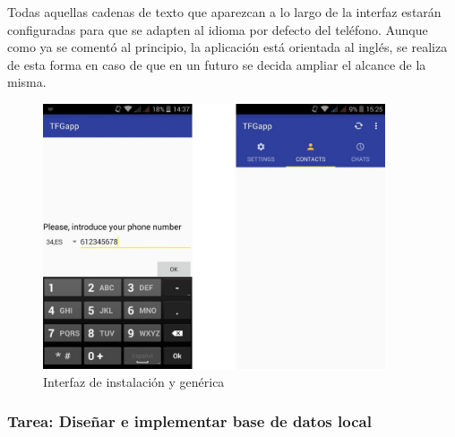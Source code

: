 Todas aquellas cadenas de texto que aparezcan a lo largo de la interfaz estarán configuradas para que se adapten al idioma por defecto del teléfono. Aunque como ya se comentó al principio, la aplicación está orientada al inglés, se realiza de esta forma en caso de que en un futuro se decida ampliar el alcance de la misma.

\begin{figure}[!h]
\begin{center}
\includegraphics[width=0.9\textwidth]{./figures/interfaz-instalacion.jpg}
\caption[Interfaz de instalación y genérica]{Interfaz de instalación y genérica}
\label{fig:interfaz-instalacion}
\end{center}
\end{figure}


\subsubsection{Tarea: Diseñar e implementar base de datos local}

